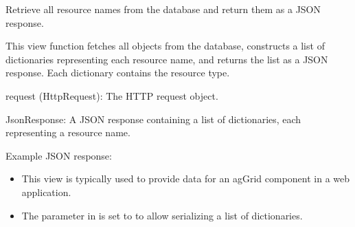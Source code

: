 \documentclass[letterpaper,10pt,english]{sphinxmanual}
\begin{document}

\begin{fulllineitems}
\label{\detokenize{app:app.views.get_names}}
\pysigstartsignatures
{}
\pysigstopsignatures
\sphinxAtStartPar
Retrieve all resource names from the database and return them as a JSON response.

\sphinxAtStartPar
This view function fetches all  objects from the database, 
constructs a list of dictionaries representing each resource name, and 
returns the list as a JSON response. Each dictionary contains the resource type.
\begin{description}
\sphinxAtStartPar
request (HttpRequest): The HTTP request object.

\sphinxAtStartPar
JsonResponse: A JSON response containing a list of dictionaries, each representing a resource name.

\sphinxAtStartPar
Example JSON response:

\begin{sphinxVerbatim}[commandchars=\\\{\}]
\PYG{p}{[}
\PYG{p}{]}
\end{sphinxVerbatim}

\begin{itemize}
\item {} 
\sphinxAtStartPar
This view is typically used to provide data for an ag\sphinxhyphen{}Grid component in a web application.

\item {} 
\sphinxAtStartPar
The  parameter in  is set to  to allow serializing a list of dictionaries.

\end{itemize}

\end{description}

\end{fulllineitems}
\end{document}
